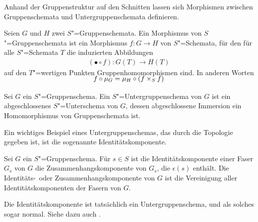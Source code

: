 Anhand der Gruppenstruktur auf den Schnitten lassen sich
Morphismen zwischen Gruppenschemata und Untergruppenschemata
definieren.
\begin{Definition}
  Seien $G$ und $H$ zwei $S$"=Gruppenschemata.
  Ein Morphismus von $S$"=Gruppenschemata ist ein Morphismus $f\colon
  G\to H$ von $S$"=Schemata, für den für alle $S$"=Schemata $T$ die
  induzierten Abbildungen
  \begin{gather*}
    (\bullet\circ f)\colon G(T)\to H(T)
  \end{gather*}
  auf den $T$"=wertigen Punkten Gruppenhomomorphismen sind.
  In anderen Worten
  \begin{gather*}
    \SwapAboveDisplaySkip
    f\circ\mu_G = \mu_H\circ(f\times_S f)
  \end{gather*}
\end{Definition}

\begin{Definition}[Untergruppenschema]
  Sei $G$ ein $S$"=Gruppenschema.
  Ein $S$"=Untergruppenschema von $G$ ist ein abgeschlossenes
  $S$"=Unterschema von $G$, dessen abgeschlossene Immersion ein
  Homomorphismus von Gruppenschemata ist.
\end{Definition}

Ein wichtiges Beispiel eines Untergruppenschemas, das durch die
Topologie gegeben ist, ist die sogenannte Identitätskomponente.
\begin{Definition}[Identitätskomponente]
  Sei $G$ ein $S$"=Gruppenschema.
  Für $s\in S$ ist die Identitätskomponente einer Faser $G_s$ von $G$
  die Zusammenhangskomponente von $G_s$, die $\epsilon(s)$ enthält.
  Die Identitäts-~oder Zusammenhangskomponente von $G$ ist
  die Vereinigung aller Identitätskomponenten der Fasern von $G$.
\end{Definition}
Die Identitätskomponente ist tatsächlich ein Untergruppenschema, und
als solches sogar normal. Siehe dazu auch
\cite[Proposition~IV.1.5]{silverman2}.

